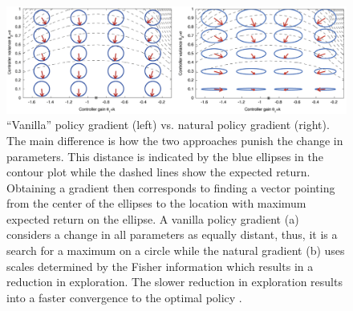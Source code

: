 \begin{figure}[t]
    \centering
    \includegraphics[width=1\linewidth]{Images/4_0_euclidean_vs_natural}
	\caption[``Vanilla'' policy gradient vs. natural policy gradient]{``Vanilla'' policy gradient (left) vs. natural policy gradient (right). The main difference is how the two approaches punish the change in parameters. This distance is 	indicated by the blue ellipses in the contour plot while the dashed lines show the expected return. Obtaining a gradient then corresponds to finding a vector pointing from the center of the ellipses to the location with maximum expected return on the ellipse. A vanilla policy gradient (a) considers a change in all parameters as equally distant, thus, it is a search for a maximum on a circle while the natural gradient (b) uses scales determined by the Fisher information which results in a reduction in exploration. The slower reduction in exploration results into a faster convergence to the optimal policy \cite{peters2008reinforcement}.}
\end{figure}

